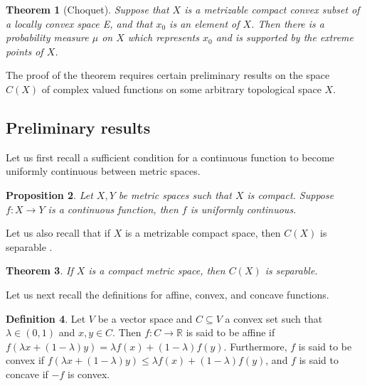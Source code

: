 \documentclass[12pt,a4paper]{amsart}
\newtheorem{theorem}{Theorem}
\newtheorem{proposition}[theorem]{Proposition}
\theoremstyle{definition}
\newtheorem{definition}[theorem]{Definition}
\begin{document}
	\begin{theorem}[Choquet]
		Suppose that $X$ is a metrizable compact convex subset of a locally convex space E, and that $x_0$ is an element of $X$. Then there is a probability measure $\mu$ on $X$ which represents $x_0$ and is supported by the extreme points of $X$.
	\end{theorem}
	
	The proof of the theorem requires certain preliminary results on the space $C(X)$ of complex valued functions on some arbitrary topological space $X$.
	
	\subsection{Preliminary results}
	Let us first recall a sufficient condition for a continuous function to become uniformly continuous between metric spaces.
	\begin{proposition}\label{uniform-continuity-of-f}
		Let $X, Y$ be metric spaces such that $X$ is compact. Suppose $f: X \rightarrow Y$ is a continuous function, then $f$ is uniformly continuous. 
	\end{proposition}
	
	Let us also recall that if $X$ is a metrizable compact space, then $C(X)$ is separable  \cite[Page 140 Theorem 6.6]{conway}.
	
	\begin{theorem}\label{compact-metric-space-implies-c(x)-separable}
		If $X$ is a compact metric space, then $C(X)$ is separable. 
	\end{theorem}
	
	Let us next recall the definitions for affine, convex, and concave functions.
	\begin{definition}
		   Let $V$ be a vector space and $C \subseteq V$ a convex set such that $\lambda \in (0, 1)$ and $x, y \in C$. Then $f: C \rightarrow \mathbb{R}$ is said to be affine if $f(\lambda x + (1-\lambda)y) = \lambda f(x) + (1- \lambda) f(y)$. Furthermore, $f$ is said to be convex if
		$f(\lambda x + (1-\lambda)y) \leq \lambda f(x) + (1- \lambda) f(y)$, and $f$ is said to concave if $-f$ is convex.
	\end{definition}
	
\end{document}
